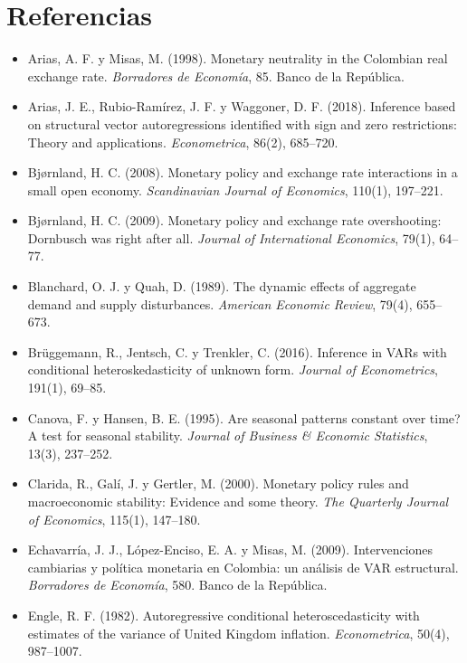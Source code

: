 \documentclass[12pt,letterpaper]{article}
\begin{document}
\clearpage

\section*{Referencias}
\begin{itemize}[label={}, leftmargin=1.5em, itemindent=-1.5em]
\item Arias, A. F. y Misas, M. (1998). Monetary neutrality in the Colombian real exchange rate. \textit{Borradores de Econom\'ia}, 85. Banco de la Rep\'ublica.
\item Arias, J. E., Rubio-Ram\'irez, J. F. y Waggoner, D. F. (2018). Inference based on structural vector autoregressions identified with sign and zero restrictions: Theory and applications. \textit{Econometrica}, 86(2), 685--720.
\item Bj{\o}rnland, H. C. (2008). Monetary policy and exchange rate interactions in a small open economy. \textit{Scandinavian Journal of Economics}, 110(1), 197--221.
\item Bj{\o}rnland, H. C. (2009). Monetary policy and exchange rate overshooting: Dornbusch was right after all. \textit{Journal of International Economics}, 79(1), 64--77.
\item Blanchard, O. J. y Quah, D. (1989). The dynamic effects of aggregate demand and supply disturbances. \textit{American Economic Review}, 79(4), 655--673.
\item Br\"uggemann, R., Jentsch, C. y Trenkler, C. (2016). Inference in VARs with conditional heteroskedasticity of unknown form. \textit{Journal of Econometrics}, 191(1), 69--85.
\item Canova, F. y Hansen, B. E. (1995). Are seasonal patterns constant over time? A test for seasonal stability. \textit{Journal of Business \& Economic Statistics}, 13(3), 237--252.
\item Clarida, R., Gal\'i, J. y Gertler, M. (2000). Monetary policy rules and macroeconomic stability: Evidence and some theory. \textit{The Quarterly Journal of Economics}, 115(1), 147--180.
\item Echavarría, J. J., López-Enciso, E. A. y Misas, M. (2009). Intervenciones cambiarias y política monetaria en Colombia: un análisis de VAR estructural. \textit{Borradores de Economía}, 580. Banco de la República.
\item Engle, R. F. (1982). Autoregressive conditional heteroscedasticity with estimates of the variance of United Kingdom inflation. \textit{Econometrica}, 50(4), 987--1007.

\end{itemize}
\end{document}
